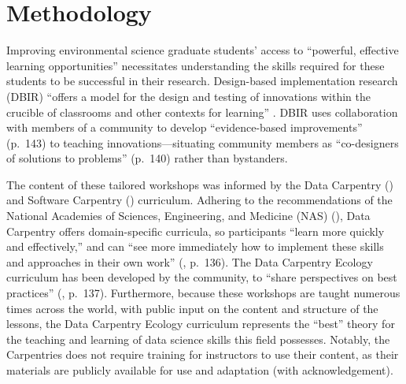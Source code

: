 \documentclass[12pt]{article}
\begin{document}

\section{Methodology}

\noindent Improving environmental science graduate students' access to 
``powerful, effective learning opportunities'' \citep[p.\ 137]{penuel}
necessitates understanding the skills required for these students to be
successful in their research. Design-based implementation research (DBIR) 
\citep{confrey, penuel, oneill} ``offers a model for the design and testing of
innovations within the crucible of classrooms and other contexts for learning'' 
\citep[p.\ 140]{penuel}. DBIR uses collaboration with members of a
community to develop ``evidence-based improvements'' (p.\ 143) to teaching 
innovations---situating community members as ``co-designers of solutions to 
problems'' (p.\ 140) rather than bystanders. 

\quad The content of these tailored workshops was informed by the Data 
Carpentry (\citeyear {data-carpentry}) and Software Carpentry 
(\citeyear{software-carpentry}) curriculum. Adhering to the recommendations of 
the National Academies of Sciences, Engineering, and Medicine (NAS)
(\citeyear{nas}), Data Carpentry offers domain-specific curricula, so
participants ``learn more quickly and effectively,'' and can ``see more
immediately how to implement these skills and approaches in their own work''
(\citeyear{carpentry}, p.\ 136). The Data Carpentry Ecology curriculum has been
developed by the community, to ``share perspectives on best practices''
(\citeyear{carpentry}, p.\ 137). Furthermore, because these workshops are taught
numerous times across the world, with public input on the content and structure
of the lessons, the Data Carpentry Ecology curriculum represents the ``best''
theory for the teaching and learning of data science skills this field
possesses. Notably, the Carpentries does not require training for instructors
to use their content, as their materials are publicly available for use and
adaptation (with acknowledgement). 

\end{document}
